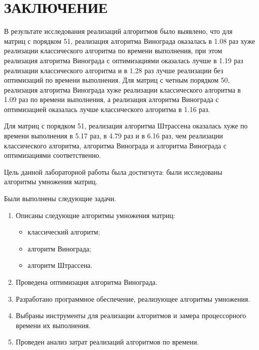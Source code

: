 \chapter*{ЗАКЛЮЧЕНИЕ}

В результате исследования реализаций алгоритмов было выявлено, что для матриц с порядком 51, реализация алгоритма Винограда оказалась в 1.08 раз хуже реализации классического алгоритма по времени выполнения, при этом реализация алгоритма Винограда с оптимизациями оказалась лучше в 1.19 раз реализации классического алгоритма и в 1.28 раз лучше реализации без оптимизаций по времени выполнения.
Для матриц с четным порядком 50, реализация алгоритма Винограда хуже реализации классического алгоритма в 1.09 раз по времени выполнения, а реализация алгоритма Винограда с оптимизацией оказалась лучше классического алгоритма в 1.16 раз. 

Для матриц с порядком 51, реализация алгоритма Штрассена оказалась хуже по времени выполнения в 5.17 раз, в 4.79 раз и в 6.16 раз, чем реализации классического алгоритма, алгоритма Винограда и алгоритма Винограда с оптимизациями соответственно. 

Цель данной лабораторной работы была достигнута: были исследованы алгоритмы умножения матриц.

Были выполнены следующие задачи.
\begin{enumerate}
	\item Описаны следующие алгоритмы умножения матриц:
	\begin{itemize}
		\item классический алгоритм;
		\item алгоритм Винограда;
		\item алгоритм Штрассена.
	\end{itemize}
	\item Проведена оптимизация алгоритма Винограда.
	\item Разработано программное обеспечение, реализующее алгоритмы умножения.
	\item Выбраны инструменты для реализации алгоритмов и замера процессорного времени их выполнения.
	\item Проведен анализ затрат реализаций алгоритмов по времени. 
\end{enumerate}
